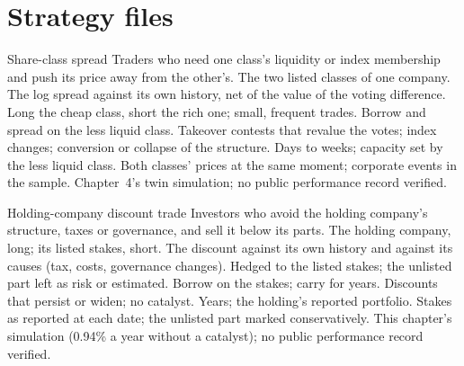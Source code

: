 \section{Strategy files}

\begin{strategyfile}{Share-class spread}\label{strat:s1:share-classes-holding-companies-closed-end-funds-spacs:class}
 Traders who need one class's liquidity or index membership and push its price away from the other's.
 The two listed classes of one company.
 The log spread against its own history, net of the value of the voting difference.
 Long the cheap class, short the rich one; small, frequent trades.
 Borrow and spread on the less liquid class.
 Takeover contests that revalue the votes; index changes; conversion or collapse of the structure.
 Days to weeks; capacity set by the less liquid class.
 Both classes' prices at the same moment; corporate events in the sample.
 Chapter~4's twin simulation; no public performance record verified.
\end{strategyfile}

\begin{strategyfile}{Holding-company discount trade}\label{strat:s1:share-classes-holding-companies-closed-end-funds-spacs:holding}
 Investors who avoid the holding company's structure, taxes or governance, and sell it below its parts.
 The holding company, long; its listed stakes, short.
 The discount against its own history and against its causes (tax, costs, governance changes).
 Hedged to the listed stakes; the unlisted part left as risk or estimated.
 Borrow on the stakes; carry for years.
 Discounts that persist or widen; no catalyst.
 Years; the holding's reported portfolio.
 Stakes as reported at each date; the unlisted part marked conservatively.
 This chapter's simulation (0.94\% a year without a catalyst); no public performance record verified.
\end{strategyfile}

